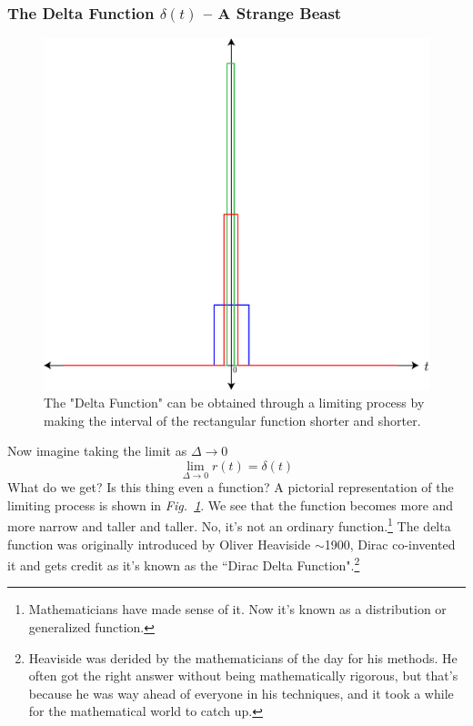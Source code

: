 \subsubsection{The Delta Function $\delta(t)$ -- A Strange Beast}
\begin{figure}[tb]
\centering
\includegraphics[width=.5\columnwidth]{rect_func_delta}
\caption{The "Delta Function" can be obtained through a limiting process by making the interval of the rectangular function shorter and shorter. }
\label{fig:rect_func_delta}
\end{figure}
Now imagine taking the limit as $\Delta\rightarrow 0$
    \begin{equation}
        \lim_{\Delta\rightarrow0}{r\left(t\right)=\delta(t)}
    \end{equation}
What do we get?  Is this thing even a function?  A pictorial representation of the limiting process is shown in \emph{Fig.~\ref{fig:rect_func_delta}}.  We see that the function becomes more and more narrow and taller and taller.
 No, it's not an ordinary function.\footnote{Mathematicians have made sense of it.  Now it's known as a distribution or generalized function.}  The delta function was originally introduced by Oliver Heaviside $\sim$1900, Dirac co-invented it and gets credit as it's known as the ``Dirac Delta Function".\footnote{Heaviside was derided by the mathematicians of the day for his methods.  He often got the right answer without being mathematically rigorous, but that's because he was way ahead of everyone in his techniques, and it took a while for the mathematical world to catch up.}
